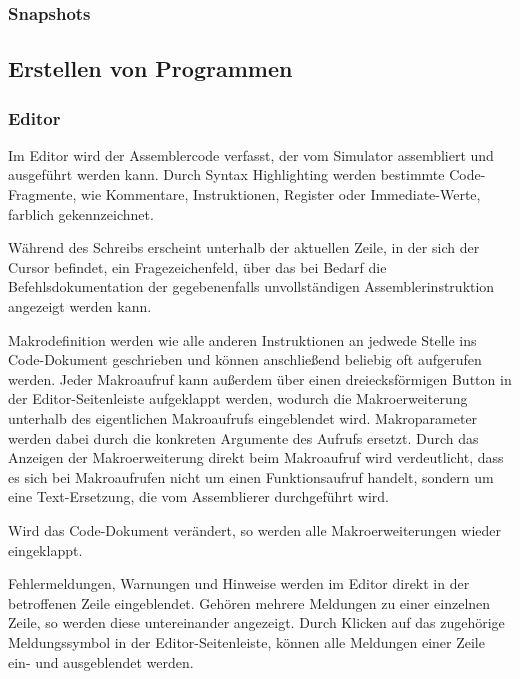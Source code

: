\subsubsection{Snapshots}


\subsection{Erstellen von Programmen}

\subsubsection{Editor}

Im Editor wird der Assemblercode verfasst, der vom Simulator assembliert und ausgeführt werden kann.
Durch Syntax Highlighting werden bestimmte Code-Fragmente, wie Kommentare, Instruktionen,
Register oder Immediate-Werte, farblich gekennzeichnet.

Während des Schreibs erscheint unterhalb der aktuellen Zeile, in der sich der Cursor
befindet, ein Fragezeichenfeld, über das bei Bedarf die Befehlsdokumentation der
gegebenenfalls unvollständigen Assemblerinstruktion angezeigt werden kann.

Makrodefinition werden wie alle anderen Instruktionen an jedwede Stelle ins Code-Dokument geschrieben und können anschließend beliebig oft aufgerufen werden. Jeder Makroaufruf kann außerdem über einen dreiecksförmigen Button in der Editor-Seitenleiste aufgeklappt werden, wodurch die Makroerweiterung unterhalb des eigentlichen Makroaufrufs eingeblendet wird. Makroparameter werden dabei durch die konkreten Argumente des Aufrufs ersetzt. Durch das Anzeigen der Makroerweiterung direkt beim Makroaufruf wird verdeutlicht, dass es sich bei Makroaufrufen nicht um einen Funktionsaufruf handelt, sondern um eine Text-Ersetzung, die vom Assemblierer durchgeführt wird.

Wird das Code-Dokument verändert, so werden alle Makroerweiterungen wieder eingeklappt.

Fehlermeldungen, Warnungen und Hinweise werden im Editor direkt in der betroffenen Zeile eingeblendet. Gehören mehrere Meldungen zu einer einzelnen Zeile, so werden diese untereinander angezeigt. Durch Klicken auf das zugehörige Meldungssymbol in der Editor-Seitenleiste, können alle Meldungen einer Zeile ein- und ausgeblendet werden.

